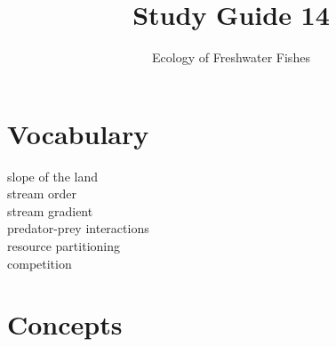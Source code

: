 \documentclass[letterpaper]{tufte-handout}
\title{Study Guide 14}
\author{Ecology of Freshwater Fishes}
\date{} %
\begin{document}
\maketitle	%


\section{Vocabulary} 
\vspace{-1\baselineskip}
\begin{multicols}{2}
slope of the land \\
stream order \\
stream gradient \\
predator-prey interactions \\
resource partitioning \\
competition
\end{multicols}

\section{Concepts}
\end{document}
